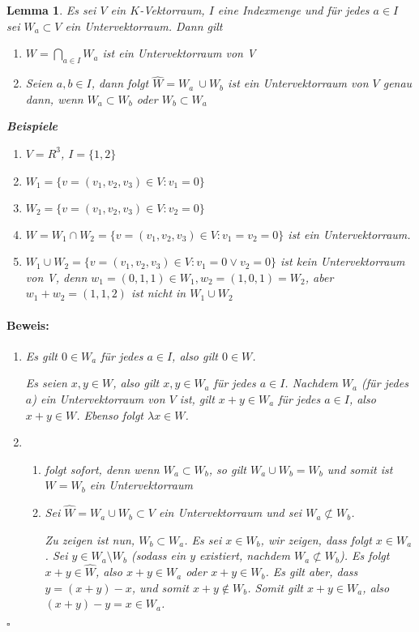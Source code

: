 \documentclass{report}
\newcommand{\lb}{\lambda}
\theoremstyle{customrem}
\theoremstyle{customdef}
\newtheorem{lem}[definition]{Lemma}
\renewenvironment{proof}{\vspace{-.75cm}\paragraph{Beweis: }}{\vspace{-.5cm}\hfill$\square$}
\begin{document}
	\begin{lem}
		Es sei $V$ ein $K$-Vektorraum, $I$ eine Indexmenge und für jedes $a \in I$ sei $W_a \subset V$ ein Untervektorraum. Dann gilt
		\begin{enumerate}
			\item $W = \bigcap_{a \in I} W_a$ ist ein Untervektorraum von V
			\item Seien $a, b \in I$, dann folgt $\hat{W} = W_a \ \cup W_b$ ist ein Untervektorraum von $V$ genau dann, wenn $W_a \subset W_b$ oder $W_b \subset W_a$
		\end{enumerate}
		\textbf{Beispiele}
		\begin{enumerate}
			\itemsep0cm 
			\item $V = R^3$, $I = \{1, 2\}$
			\item $W_1 = \{v = (v_1, v_2, v_3) \in V : v_1 = 0\}$
			\item $W_2 = \{v = (v_1, v_2, v_3) \in V : v_2 = 0\}$
			\item $W = W_1 \cap W_2 = \{v = (v_1, v_2, v_3) \in V : v_1 = v_2 = 0\}$ ist ein Untervektorraum.
			\item $W_1 \cup W_2 = \{v = (v_1, v_2, v_3) \in V : v_1 = 0 \lor v_2 = 0\}$ ist kein Untervektorraum von V, denn $w_1 = (0, 1, 1) \in W_1, w_2 = (1, 0, 1) = W_2$, aber $w_1 + w_2 = (1, 1, 2)$ ist nicht in $W_1 \cup W_2$
		\end{enumerate}
		\vspace{.25cm}
		\begin{proof}
			\begin{enumerate}
				\item Es gilt $0 \in W_a$ für jedes $a \in I$, also gilt $0 \in W$.
				
				Es seien $x, y \in W$, also gilt $x, y \in W_a$ für jedes $a \in I$. Nachdem $W_a$ (für jedes $a$) ein Untervektorraum von $V$ ist, gilt $x + y \in W_a$ für jedes $a \in I$, also $x + y \in W$. Ebenso folgt $\lb x \in W$.
				\item 
				\begin{enumerate}
					\item["`$\Leftarrow$"'] folgt sofort, denn wenn $W_a \subset W_b$, so gilt $W_a \cup W_b = W_b$ und somit ist $W = W_b$ ein Untervektorraum
					\item["`$\Rightarrow$"']  Sei $\hat{W} = W_a \cup W_b \subset V$ ein Untervektorraum und sei $W_a \not\subset W_b$.
					
					 Zu zeigen ist nun, $W_b \subset W_a$. Es sei $x \in W_b$, wir zeigen, dass folgt $x \in W_a$. Sei $y \in W_a \setminus W_b$ (sodass ein $y$ existiert, nachdem $W_a \not\subset W_b$). Es folgt $x + y \in \hat{W}$, also $x + y \in W_a$ oder $x + y \in W_b$. Es gilt aber, dass $y = (x + y) - x$, und somit $x + y\not\in W_b$. Somit gilt $x + y \in W_a$, also $(x + y) - y = x \in W_a$.
				\end{enumerate}
			\end{enumerate}
		\end{proof}		
	\end{lem}
	
\end{document}
